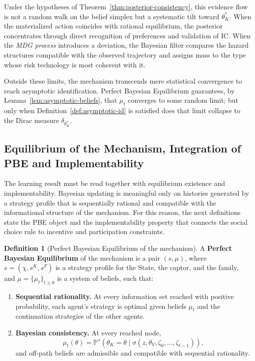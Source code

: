 \documentclass[12pt,a4paper]{article}
\theoremstyle{plain}
\theoremstyle{definition}
\newtheorem{definition}[theorem]{Definition}
\theoremstyle{remark}
\newcommand{\ProbE}{\mathbb{P}}
\newcommand{\1}{\mathbf{1}}
\begin{document}
Under the hypotheses of Theorem~\ref{thm:posterior-consistency}, this evidence flow is
not a random walk on the belief simplex but a systematic tilt toward
$\theta_K^\ast$. When the materialized action coincides with rational equilibrium, the
posterior concentrates through direct recognition of preferences and validation of IC.
When the \textit{MDG process} introduces a deviation, the Bayesian filter compares the
hazard structures compatible with the observed trajectory and assigns mass to the type
whose risk technology is most coherent with it.

Outside these limits, the mechanism transcends mere statistical convergence to reach
asymptotic identification. Perfect Bayesian Equilibrium guarantees, by
Lemma~\ref{lem:asymptotic-beliefs}, that $\mu_t$ converges to some random limit; but
only when Definition~\ref{def:asymptotic-id} is satisfied does that limit collapse to
the Dirac measure $\delta_{\theta_K^\ast}$.

\subsection{Equilibrium of the Mechanism, Integration of PBE and Implementability}
\label{subsec:equilibrio-mecanismo-introduccion}

The learning result must be read together with equilibrium existence and
implementability. Bayesian updating is meaningful only on histories generated by a
strategy profile that is sequentially rational and compatible with the informational
structure of the mechanism. For this reason, the next definitions state the PBE object
and the implementability property that connects the social choice rule to incentive and
participation constraints.

\begin{definition}[Perfect Bayesian Equilibrium of the mechanism]
\label{def:pbe-mechanism}
A \textbf{Perfect Bayesian Equilibrium} of the mechanism is a pair $(s,\mu)$, where
$s=(\chi,s^K,s^F)$ is a strategy profile for the State, the captor, and the family, and
$\mu=\{\mu_t\}_{t\ge0}$ is a system of beliefs, such that:
\begin{enumerate}
  \item[\textup{(a)}] \textbf{Sequential rationality.} At every information set reached
  with positive probability, each agent's strategy is optimal given beliefs $\mu_t$ and
  the continuation strategies of the other agents.
  \item[\textup{(b)}] \textbf{Bayesian consistency.} At every reached node,
  \begin{equation}
  \label{eq:def712-bayes-mu}
  \mu_t(\theta)=\ProbE^{s}\!\left(\theta_K=\theta
  \mid\sigma(z,\theta_V,\zeta_0,\ldots,\zeta_{t-1})\right),
  \end{equation}
  and off-path beliefs are admissible and compatible with sequential rationality.
\end{enumerate}
\end{definition}
\end{document}
